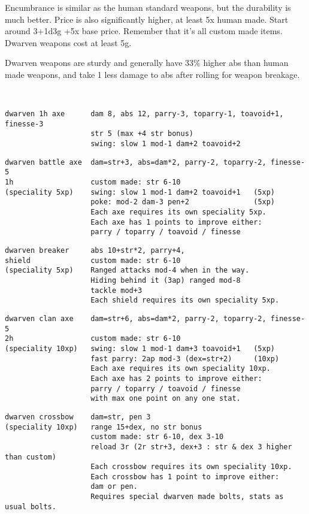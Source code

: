 Encumbrance is similar as the human standard weapons, but the durability is much better. Price is also significantly higher, at least 5x human made. Start around 3+1d3g +5x base price. Remember that it's all custom made items. Dwarven weapons cost at least 5g.

Dwarven weapons are sturdy and generally have 33\% higher abs than human made weapons, and take 1 less damage to abs after rolling for weapon breakage.

\

\small \begin{samepage} \begin{verbatim}
dwarven 1h axe      dam 8, abs 12, parry-3, toparry-1, toavoid+1, finesse-3
                    str 5 (max +4 str bonus)
                    swing: slow 1 mod-1 dam+2 toavoid+2
\end{verbatim} \blocklistgap \begin{verbatim}
dwarven battle axe  dam=str+3, abs=dam*2, parry-2, toparry-2, finesse-5
1h                  custom made: str 6-10
(speciality 5xp)    swing: slow 1 mod-1 dam+2 toavoid+1   (5xp)
                    poke: mod-2 dam-3 pen+2               (5xp)
                    Each axe requires its own speciality 5xp.
                    Each axe has 1 points to improve either:
                    parry / toparry / toavoid / finesse
\end{verbatim} \blocklistgap \begin{verbatim}
dwarven breaker     abs 10+str*2, parry+4,
shield              custom made: str 6-10
(speciality 5xp)    Ranged attacks mod-4 when in the way.
                    Hiding behind it (3ap) ranged mod-8
                    tackle mod+3
                    Each shield requires its own speciality 5xp.
\end{verbatim} \blocklistgap \begin{verbatim}
dwarven clan axe    dam=str+6, abs=dam*2, parry-2, toparry-2, finesse-5
2h                  custom made: str 6-10
(speciality 10xp)   swing: slow 1 mod-1 dam+3 toavoid+1   (5xp)
                    fast parry: 2ap mod-3 (dex=str+2)     (10xp)
                    Each axe requires its own speciality 10xp.
                    Each axe has 2 points to improve either:
                    parry / toparry / toavoid / finesse
                    with max one point on any one stat.
\end{verbatim} \blocklistgap \begin{verbatim}
dwarven crossbow    dam=str, pen 3
(speciality 10xp)   range 15+dex, no str bonus
                    custom made: str 6-10, dex 3-10
                    reload 3r (2r str+3, dex+3 : str & dex 3 higher than custom)
                    Each crossbow requires its own speciality 10xp.
                    Each crossbow has 1 point to improve either:
                    dam or pen.
                    Requires special dwarven made bolts, stats as usual bolts.
\end{verbatim} \end{samepage} \normalsize

